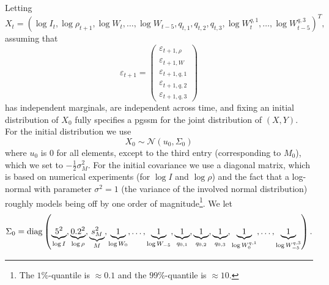 Letting $$X_{t} =\left( \log I_{t}, \log \rho_{t + 1}, \log W_{t}, \dots, \log W_{t - 5}, q_{t,1}, q_{t,2}, q_{t,3}, \log W^{q,1}_{t}, \dots, \log W^{q,3}_{t - 5}\right)^{T},$$ assuming that
$$
\varepsilon_{t + 1} = 
\begin{pmatrix}
     \varepsilon_{t + 1,\rho}\\ \varepsilon_{t + 1, W}\\ \varepsilon_{t +1, q, 1}\\ \varepsilon_{t +1, q, 2}\\ \varepsilon_{t +1, q, 3}
\end{pmatrix}
$$
has independent marginals, are independent across time, and fixing an initial distribution of $X_{0}$ fully specifies a \gls{pgssm} for the joint distribution of $(X,Y)$. For the initial distribution we use 
$$
    X_{0} \sim \mathcal N \left( u_{0}, \Sigma_{0} \right)
$$
where $u_{0}$ is $0$ for all elements, except to the third entry (corresponding to $M_{0}$), which we set to $-\frac{1}{2} \sigma^{2}_M$. For the initial covariance we use a diagonal matrix, which is based on numerical experiments (for $\log I$ and $\log \rho$) and the fact that a log-normal with parameter $\sigma^{2} = 1$ (the variance of the involved normal distribution) roughly models being off by one order of magnitude\footnote{The $1\%$-quantile is $\approx 0.1$ and the $99\%$-quantile is $\approx 10$.}. We let
$$
    \Sigma_{0} = \operatorname{diag} \left( 
        \underbrace{5^{2}}_{\log I},
        \underbrace{0.2^{2}}_{\log \rho},
        \underbrace{s^{2}_M}_{M},
        \underbrace{1}_{\log W_{0}},
        \dots,
        \underbrace{1}_{\log W_{-5}},
        \underbrace{1}_{q_{0, 1}},
        \underbrace{1}_{q_{0, 2}},
        \underbrace{1}_{q_{0, 3}},
        \underbrace{1}_{\log W^{q,1}_{0}},
        \dots,
        \underbrace{1}_{\log W^{q,3}_{-5}}
    \right).
$$

